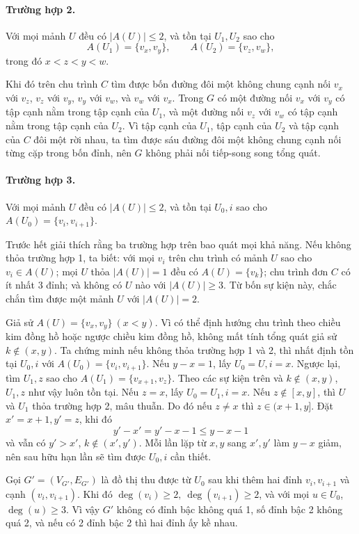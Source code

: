 \documentclass[11pt]{article}
\begin{document}
\paragraph{Trường hợp 2.}
Với mọi mảnh \(U\) đều có \(|A(U)|\le2\), và tồn tại \(U_1,U_2\) sao cho
\[
  A(U_1)=\{v_x,v_y\},\qquad A(U_2)=\{v_z,v_w\},
\]
trong đó \(x<z<y<w\).

Khi đó trên chu trình \(C\) tìm được bốn đường đôi một không chung cạnh nối
\(v_x\) với \(v_z\), \(v_z\) với \(v_y\), \(v_y\) với \(v_w\), và \(v_w\) với
\(v_x\). Trong \(G\) có một đường nối \(v_x\) với \(v_y\) có tập cạnh nằm trong
tập cạnh của \(U_1\), và một đường nối \(v_z\) với \(v_w\) có tập cạnh nằm
trong tập cạnh của \(U_2\). Vì tập cạnh của \(U_1\), tập cạnh của \(U_2\) và
tập cạnh của \(C\) đôi một rời nhau, ta tìm được sáu đường đôi một không chung
cạnh nối từng cặp trong bốn đỉnh, nên \(G\) không phải nối tiếp-song song tổng
quát.

\paragraph{Trường hợp 3.}
Với mọi mảnh \(U\) đều có \(|A(U)|\le2\), và tồn tại \(U_0,i\) sao cho
\(A(U_0)=\{v_i,v_{i+1}\}\).

Trước hết giải thích rằng ba trường hợp trên bao quát mọi khả năng. Nếu không
thỏa trường hợp 1, ta biết: với mọi \(v_i\) trên chu trình có mảnh \(U\) sao
cho \(v_i\in A(U)\); mọi \(U\) thỏa \(|A(U)|=1\) đều có \(A(U)=\{v_k\}\);
chu trình đơn \(C\) có ít nhất 3 đỉnh; và không có \(U\) nào với
\(|A(U)|\ge3\). Từ bốn sự kiện này, chắc chắn tìm được một mảnh \(U\) với
\(|A(U)|=2\).

Giả sử \(A(U)=\{v_x,v_y\}\ (x<y)\). Vì có thể định hướng chu trình theo chiều
kim đồng hồ hoặc ngược chiều kim đồng hồ, không mất tính tổng quát giả sử
\(k\notin(x,y)\). Ta chứng minh nếu không thỏa trường hợp 1 và 2, thì nhất
định tồn tại \(U_0,i\) với \(A(U_0)=\{v_i,v_{i+1}\}\). Nếu \(y-x=1\), lấy
\(U_0=U,i=x\). Ngược lại, tìm \(U_1,z\) sao cho
\(A(U_1)=\{v_{x+1},v_z\}\). Theo các sự kiện trên và \(k\notin(x,y)\), \(U_1,z\)
như vậy luôn tồn tại. Nếu \(z=x\), lấy \(U_0=U_1,i=x\). Nếu \(z\notin[x,y]\),
thì \(U\) và \(U_1\) thỏa trường hợp 2, mâu thuẫn. Do đó nếu \(z\ne x\) thì
\(z\in(x+1,y]\). Đặt \(x'=x+1,y'=z\), khi đó
\[
  y'-x'=y'-x-1\le y-x-1
\]
và vẫn có \(y'>x'\), \(k\notin(x',y')\). Mỗi lần lặp từ \(x,y\) sang
\(x',y'\) làm \(y-x\) giảm, nên sau hữu hạn lần sẽ tìm được \(U_0,i\) cần
thiết.

Gọi \(G'=(V_{G'},E_{G'})\) là đồ thị thu được từ \(U_0\) sau khi thêm hai đỉnh
\(v_i,v_{i+1}\) và cạnh \((v_i,v_{i+1})\). Khi đó
\(\deg(v_i)\ge2,\ \deg(v_{i+1})\ge2\), và với mọi \(u\in U_0\),
\(\deg(u)\ge3\). Vì vậy \(G'\) không có đỉnh bậc không quá 1, số đỉnh bậc 2
không quá 2, và nếu có 2 đỉnh bậc 2 thì hai đỉnh ấy kề nhau.
\end{document}

